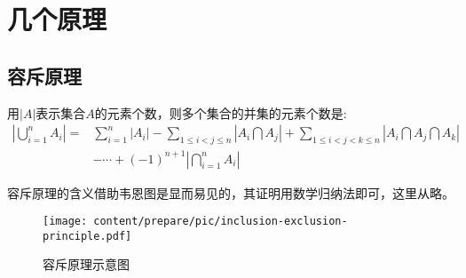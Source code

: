 
\section{几个原理}
\label{sec:some-principle}

\subsection{容斥原理}
\label{subsec:inclusion-exclusion-principle}

\begin{principle}[容斥原理]
  用$|A|$表示集合$A$的元素个数，则多个集合的并集的元素个数是:
  \begin{eqnarray}
    \label{eq:inclusion-exclusion-principle}
    \left| \bigcup_{i=1}^nA_i \right| = & \sum_{i=1}^n|A_i|-\sum_{1\leqslant i <j \leqslant n} \left| A_i \bigcap A_j \right| +\sum_{1 \leqslant i <j <k \leqslant n} \left| A_i\bigcap A_j \bigcap A_k \right| \nonumber \\
 & -\cdots+(-1)^{n+1} \left| \bigcap_{i=1}^nA_i \right|
  \end{eqnarray}
\end{principle}
容斥原理的含义借助韦恩图是显而易见的，其证明用数学归纳法即可，这里从略。

\begin{figure}[htbp]
  \centering
\texttt{[image: content/prepare/pic/inclusion-exclusion-principle.pdf]}
\caption{容斥原理示意图}
\label{fig:inclusion-exclusion-principle}
\end{figure}


